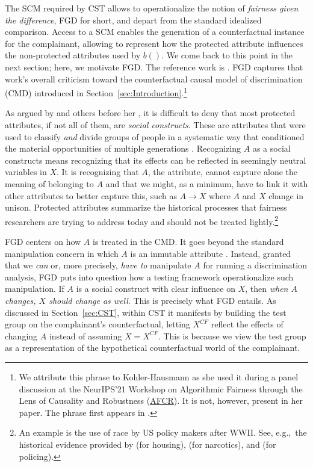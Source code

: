 The SCM required by CST allows to operationalize the notion of \textit{fairness given the difference}, FGD for short, and depart from the standard idealized comparison.
Access to a SCM enables the generation of a counterfactual instance for the complainant, allowing to represent how the protected attribute influences the non-protected attributes used by $b()$.
We come back to this point in the next section; here, we motivate FGD.
% 
The reference work is \textcite{Kohler2018CausalEddie}.
FGD captures that work's overall criticism toward the counterfactual causal model of discrimination (CMD) introduced in Section~\ref{sec:Introduction}.\footnote{We attribute this phrase to Kohler-Hausmann as she used it during a panel discussion at the NeurIPS'21 Workshop on Algorithmic Fairness through the Lens of Causality and Robustness (\href{https://www.afciworkshop.org/afcr2021}{AFCR}). It is not, however, present in her paper. 
The phrase first appears in \textcite{DBLP:conf/eaamo/AlvarezR23}.}

As argued by \textcite{Kohler2018CausalEddie} and others before her \parencite{Bonilla1997_RethinkingRace, Sen2016_RaceABundle}, it is difficult to deny that most protected attributes, if not all of them, are \textit{social constructs}. 
These are attributes that were used to classify \textit{and} divide groups of people in a systematic way that conditioned the material opportunities of multiple generations \parencite{Mallon2007SocialConstruction, rose_constructivist_2022}. 
Recognizing $A$ as a social constructs means recognizing that its effects can be reflected in seemingly neutral variables in $X$. It is recognizing that $A$, the attribute, cannot capture alone the meaning of belonging to $A$ and that we might, as a minimum, have to link it with other attributes to better capture this, such as $A \rightarrow X$ where $A$ and $X$ change in unison. Protected attributes summarize the historical processes that fairness researchers are trying to address today and should not be treated lightly.\footnote{An example is the use of race by US policy makers after WWII. See, e.g.,~the historical evidence provided by \textcite{Rothstein2017Color} (for housing), \textcite{Schneider2008Smack} (for narcotics), and \textcite{Adler2019MurderNewOrleansJimCrow} (for policing).}

FGD centers on how $A$ is treated in the CMD. 
It goes beyond the standard manipulation concern in which $A$ is an inmutable attribute \parencite{Angrist2008MostlyHarmless}. 
Instead, granted that we \textit{can} or, more precisely, \textit{have to} manipulate $A$ for running a discrimination analysis, FGD puts into question how a testing framework operationalize such manipulation.
If $A$ is a social construct with clear influence on $X$, then \textit{when $A$ changes, $X$ should change as well}.
This is precisely what FGD entails.
As discussed in Section~\ref{sec:CST},
within CST it manifests by building the test group on the complainant's counterfactual, letting $X^{CF}$ reflect the effects of changing $A$ instead of assuming $X = X^{CF}$. 
This is because we view the test group as a representation of the hypothetical counterfactual world of the complainant.

